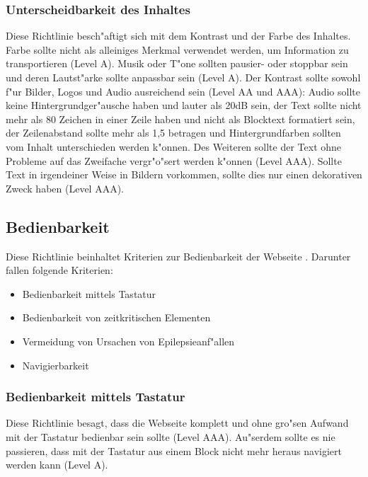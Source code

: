 \documentclass[a4paper,bibtotoc,oneside]{scrbook}
\begin{document}
\subsubsection{Unterscheidbarkeit des Inhaltes}
Diese Richtlinie besch"aftigt sich mit dem Kontrast und der Farbe des Inhaltes. Farbe sollte nicht als alleiniges Merkmal verwendet werden, um Information zu transportieren (Level A). Musik oder T"one sollten pausier- oder stoppbar sein und deren Lautst"arke sollte anpassbar sein (Level A). Der Kontrast sollte sowohl f"ur Bilder, Logos und Audio ausreichend sein (Level AA und AAA): Audio sollte keine Hintergrundger"ausche haben und lauter als 20dB sein, der Text sollte nicht mehr als 80 Zeichen in einer Zeile haben und nicht als Blocktext formatiert sein, der Zeilenabstand sollte mehr als 1,5 betragen und Hintergrundfarben sollten vom Inhalt unterschieden werden k"onnen. Des Weiteren sollte der Text ohne Probleme auf das Zweifache vergr"o"sert werden k"onnen (Level AAA). Sollte Text in irgendeiner Weise in Bildern vorkommen, sollte dies nur einen dekorativen Zweck haben (Level AAA). \cite[Abschnitt 1.4]{wcag2}



\subsection{Bedienbarkeit}
Diese Richtlinie beinhaltet Kriterien zur Bedienbarkeit der Webseite \cite[Abschnitt 2]{wcag2}. Darunter fallen folgende Kriterien: 

\begin{itemize}
\item Bedienbarkeit mittels Tastatur \cite[Abschnitt 2.1]{wcag2}
\item Bedienbarkeit von zeitkritischen Elementen \cite[Abschnitt 2.2]{wcag2}
\item Vermeidung von Ursachen von Epilepsieanf"allen \cite[Abschnitt 2.3]{wcag2}
\item Navigierbarkeit \cite[Abschnitt 2.4]{wcag2}
\end{itemize}

\subsubsection{Bedienbarkeit mittels Tastatur}
Diese Richtlinie besagt, dass die Webseite komplett und ohne gro"sen Aufwand mit der Tastatur bedienbar sein sollte (Level AAA). Au"serdem sollte es nie passieren, dass mit der Tastatur aus einem Block nicht mehr heraus navigiert werden kann (Level A). \cite[Abschnitt 2.1]{wcag2}
\end{document}
